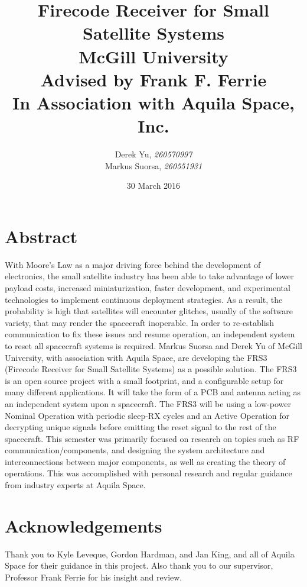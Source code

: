 \documentclass[12pt, twoside]{report}
\title{
    {Firecode Receiver for Small Satellite Systems}\\
    {\large McGill University}\\
    {\small Advised by Frank F. Ferrie}\\
    {\small In Association with \textbf{Aquila Space, Inc.}}\\
}
\author{Derek Yu, \textit{260570997}\\ Markus Suorsa, \textit{260551931}}
\date{ 30 March 2016}
\begin{document}
\maketitle

\chapter*{Abstract}

\par With Moore's Law as a major driving force behind the development of electronics, the small satellite industry has been able to take advantage of lower payload costs, increased miniaturization, faster development, and experimental technologies to implement continuous deployment strategies.
As a result, the probability is high that satellites will encounter glitches, usually of the software variety, that may render the spacecraft inoperable.
In order to re-establish communication to fix these issues and resume operation, an independent system to reset all spacecraft systems is required.
Markus Suorsa and Derek Yu of McGill University, with association with Aquila Space, are developing the FRS3 (Firecode Receiver for Small Satellite Systems) as a possible solution.
The FRS3 is an open source project with a small footprint, and a configurable setup for many different applications.
It will take the form of a PCB and antenna acting as an independent system upon a spacecraft.
The FRS3 will be using a low-power Nominal Operation with periodic sleep-RX cycles and an Active Operation for decrypting unique signals before emitting the reset signal to the rest of the spacecraft.
This semester was primarily focused on research on topics such as RF communication/components, and designing the system architecture and interconnections between major components, as well as creating the theory of operations.
This was accomplished with personal research and regular guidance from industry experts at Aquila Space.


\chapter*{Acknowledgements}
Thank you to Kyle Leveque, Gordon Hardman, and Jan King, and all of Aquila Space for their guidance in this project. Also thank you to our supervisor, Professor Frank Ferrie for his insight and review.
\end{document}
